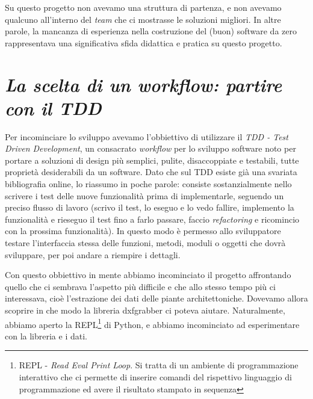 \documentclass[12pt]{report}
\begin{document}
Su questo progetto non avevamo una struttura di partenza, e non avevamo qualcuno all'interno del \textit{team} che ci mostrasse le soluzioni migliori. In altre parole, la mancanza di esperienza nella costruzione del (buon) software da zero rappresentava una significativa sfida didattica e pratica su questo progetto.

\section{\textit{La scelta di un \textit{workflow}: partire con il TDD}}

Per incominciare lo sviluppo avevamo l'obbiettivo di utilizzare il \textit{TDD - Test Driven Development}, un consacrato \textit{workflow} per lo sviluppo software noto per portare a soluzioni di design più semplici, pulite, disaccoppiate e testabili, tutte proprietà desiderabili da un software. Dato che sul TDD esiste già una svariata bibliografia online, lo riassumo in poche parole: consiste sostanzialmente nello scrivere i test delle nuove funzionalità prima di implementarle, seguendo un preciso flusso di lavoro (scrivo il test, lo eseguo e lo vedo fallire, implemento la funzionalità e rieseguo il test fino a farlo passare, faccio \textit{refactoring} e ricomincio con la prossima funzionalità). In questo modo è permesso allo sviluppatore testare l'interfaccia stessa delle funzioni, metodi, moduli o oggetti che dovrà sviluppare, per poi andare a riempire i dettagli.

Con questo obbiettivo in mente abbiamo incominciato il progetto affrontando quello che ci sembrava l'aspetto più difficile e che allo stesso tempo più ci interessava, cioè l'estrazione dei dati delle piante architettoniche. Dovevamo allora scoprire in che modo la libreria dxfgrabber ci poteva aiutare. Naturalmente, abbiamo aperto la REPL\footnote{

  REPL - \textit{Read Eval Print Loop}. Si tratta di un ambiente di programmazione interattivo che ci permette di inserire comandi del rispettivo linguaggio di programmazione ed avere il risultato stampato in sequenza 
} 
di Python, e abbiamo incominciato ad esperimentare con la libreria e i dati.
\end{document}
